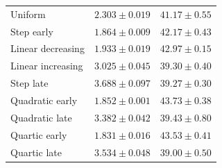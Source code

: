 \begin{minipage}{\textwidth}
\begin{center}
\begin{tabular}{@{}lrr@{}}
Uniform & \(2.303\pm0.019\) & \(41.17\pm0.55\) \\
Step early & \(1.864\pm0.009\) & \(42.17\pm0.43\) \\
Linear decreasing & \(1.933\pm0.019\) & \(42.97\pm0.15\) \\
Linear increasing & \(3.025\pm0.045\) & \(39.30\pm0.40\) \\
Step late & \(3.688\pm0.097\) & \(39.27\pm0.30\) \\
Quadratic early & \(1.852\pm0.001\) & \(43.73\pm0.38\) \\
Quadratic late & \(3.382\pm0.042\) & \(39.43\pm0.80\) \\
Quartic early & \(1.831\pm0.016\) & \(43.53\pm0.41\) \\
Quartic late & \(3.534\pm0.048\) & \(39.00\pm0.50\) \\
\bottomrule\end{tabular}\end{center}
\end{minipage}\par\bigskip
